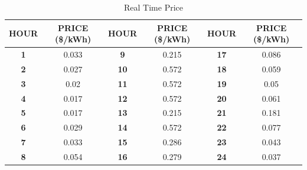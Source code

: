 	
\begin{table}[!h]
	\caption{Real Time Price}
	\begin{tabular}{|c|cl|c|cl|c|cl|}
		\hline
		\textbf{HOUR} & \multicolumn{2}{c|}{\textbf{PRICE (\$/kWh)}} & \textbf{HOUR} & \multicolumn{2}{c|}{\textbf{PRICE (\$/kWh)}} & \textbf{HOUR} & \multicolumn{2}{c|}{\textbf{PRICE (\$/kWh)}} \\ \hline
		\textbf{1}             & \multicolumn{2}{c|}{0.033}                   & \textbf{9}             & \multicolumn{2}{c|}{0.215}                   & \textbf{17}            & \multicolumn{2}{c|}{0.086}                   \\ \hline
		\textbf{2}             & \multicolumn{2}{c|}{0.027}                   & \textbf{10}            & \multicolumn{2}{c|}{0.572}                   & \textbf{18}            & \multicolumn{2}{c|}{0.059}                   \\ \hline
		\textbf{3}             & \multicolumn{2}{c|}{0.02}                    & \textbf{11}            & \multicolumn{2}{c|}{0.572}                   & \textbf{19}            & \multicolumn{2}{c|}{0.05}                    \\ \hline
		\textbf{4}             & \multicolumn{2}{c|}{0.017}                   & \textbf{12}            & \multicolumn{2}{c|}{0.572}                   & \textbf{20}            & \multicolumn{2}{c|}{0.061}                   \\ \hline
		\textbf{5}             & \multicolumn{2}{c|}{0.017}                   & \textbf{13}            & \multicolumn{2}{c|}{0.215}                   & \textbf{21}            & \multicolumn{2}{c|}{0.181}                   \\ \hline
		\textbf{6}             & \multicolumn{2}{c|}{0.029}                   & \textbf{14}            & \multicolumn{2}{c|}{0.572}                   & \textbf{22}            & \multicolumn{2}{c|}{0.077}                   \\ \hline
		\textbf{7}             & \multicolumn{2}{c|}{0.033}                   & \textbf{15}            & \multicolumn{2}{c|}{0.286}                   & \textbf{23}            & \multicolumn{2}{c|}{0.043}                   \\ \hline
		\textbf{8}             & \multicolumn{2}{c|}{0.054}                   & \textbf{16}            & \multicolumn{2}{c|}{0.279}                   & \textbf{24}            & \multicolumn{2}{c|}{0.037}                   \\ \hline
	\end{tabular}
	\label{table:rtp}
\end{table}

